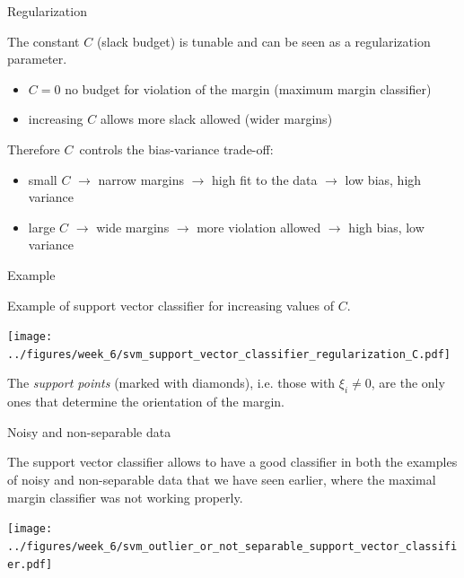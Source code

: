 \documentclass[notes]{beamer}          %
\begin{document}
\begin{frame}{Regularization}

The constant $C$ (slack budget) is tunable and can be seen as a regularization parameter.

\begin{itemize}
    \item $C = 0$ no budget for violation of the margin (maximum margin classifier)
    \item increasing $C$ allows more slack allowed (wider margins)
\end{itemize}

Therefore $C$\ controls the bias-variance trade-off:

\begin{itemize}
    \item small $C$ $\rightarrow$ narrow margins $\rightarrow$ high fit to the data $\rightarrow$ low bias, high variance
    \item large $C$ $\rightarrow$ wide margins $\rightarrow$ more violation allowed $\rightarrow$ high bias, low variance
\end{itemize}

\end{frame}

\begin{frame}{Example}

Example of support vector classifier for increasing values of $C$.

\begin{center}
\texttt{[image: ../figures/week\_6/svm\_support\_vector\_classifier\_regularization\_C.pdf]}  
\end{center}

The \textit{support points} (marked with diamonds), i.e. those with $\xi_i \neq 0$, are the only ones that determine the orientation of the margin.

\end{frame}

\begin{frame}{Noisy and non-separable data}

The support vector classifier allows to have a good classifier in both the examples of noisy and non-separable data that we have seen earlier, where the maximal margin classifier was not working properly.

\begin{center}
\texttt{[image: ../figures/week\_6/svm\_outlier\_or\_not\_separable\_support\_vector\_classifier.pdf]}  
\end{center}

\end{frame}
\end{document}
